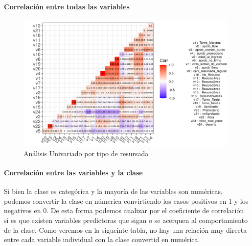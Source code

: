 \hypertarget{correlaciuxf3n-entre-todas-las-variables}{%
	\paragraph{Correlación entre todas las
		variables}\label{correlaciuxf3n-entre-todas-las-variables}}


\begin{figure}[!htb]
	\centering
	\includegraphics[width=0.98\textwidth]{imagenes/imagenes/gg_corr_todas_variables_leyenda.png}
	\caption{Análisis Univariado por tipo de resursada}
	\label{fig:tablon_correlacion}
\end{figure}

\hypertarget{correlaciuxf3n-entre-las-variables-y-la-clase}{%
	\paragraph{Correlación entre las variables y la
		clase}\label{correlaciuxf3n-entre-las-variables-y-la-clase}}

Si bien la clase es categórica y la mayoría de las variables son
numéricas, podemos convertir la clase en númerica convirtiendo los casos
positivos en 1 y los negativos en 0. De esta forma podemos analizar por
el coeficiente de correlación si es que existen variables predictoras
que sigan o se acerquen al comportamiento de la clase. Como veremos en
la sigueinte tabla, no hay una relación muy directa entre cada variable
individual con la clase convertid en numérica.




